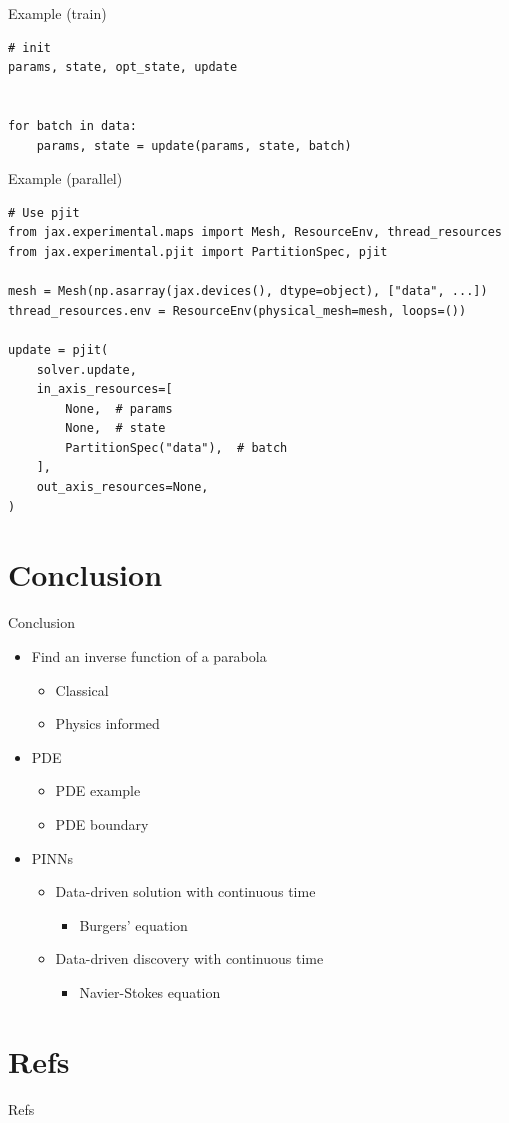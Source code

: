 \documentclass[aspectratio=1610,xcolor={dvipsnames},hyperref={colorlinks,unicode,linkcolor=violet,anchorcolor=BlueViolet,citecolor=YellowOrange,filecolor=black,urlcolor=Aquamarine}]{beamer}
\begin{document}
\begin{frame}[label={sec:orgd753f00},fragile]{Example (train)}
 \begin{verbatim}
# init
params, state, opt_state, update


for batch in data:
    params, state = update(params, state, batch)
\end{verbatim}
\end{frame}

\begin{frame}[label={sec:org108c2c5},fragile]{Example (parallel)}
 \begin{verbatim}
# Use pjit
from jax.experimental.maps import Mesh, ResourceEnv, thread_resources
from jax.experimental.pjit import PartitionSpec, pjit

mesh = Mesh(np.asarray(jax.devices(), dtype=object), ["data", ...])
thread_resources.env = ResourceEnv(physical_mesh=mesh, loops=())

update = pjit(
    solver.update,
    in_axis_resources=[
        None,  # params
        None,  # state
        PartitionSpec("data"),  # batch
    ],
    out_axis_resources=None,
)
\end{verbatim}
\end{frame}

\section{Conclusion}
\label{sec:org36ea8d6}

\begin{frame}[label={sec:org9fff3cc}]{Conclusion}
\begin{itemize}
\item Find an inverse function of a parabola
\begin{itemize}
\item Classical
\item Physics informed
\end{itemize}
\item PDE
\begin{itemize}
\item PDE example
\item PDE boundary
\end{itemize}
\item PINNs
\begin{itemize}
\item Data-driven solution with continuous time
\begin{itemize}
\item Burgers' equation
\end{itemize}
\item Data-driven discovery with continuous time
\begin{itemize}
\item Navier-Stokes equation
\end{itemize}
\end{itemize}
\end{itemize}
\end{frame}

\section{Refs}
\label{sec:orgee4b77e}

\begin{frame}[allowframebreaks]{Refs}
\printbibliography
\end{frame}
\end{document}
